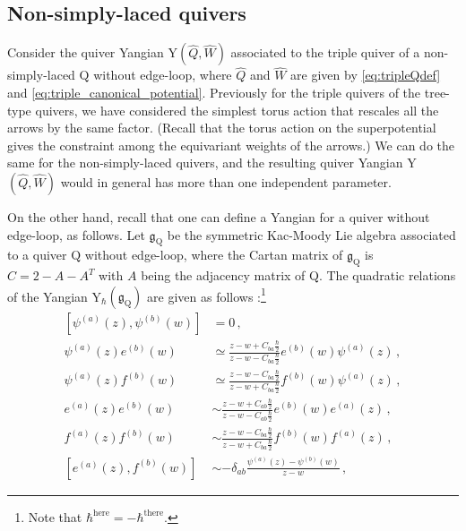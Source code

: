 \documentclass[12pt,a4paper]{article}
\renewcommand{\(}{\left(}
\renewcommand{\)}{\right)}
\renewcommand{\(}{\left(}
\renewcommand{\)}{\right)}
\begin{document}
\subsection{Non-simply-laced quivers
}\label{ssec:effective_quiver_yangian}

Consider the quiver Yangian Y$(\widehat{Q},\widehat{W})$ associated to the triple quiver of a non-simply-laced $\mathrm{Q}$ without edge-loop, where   $\widehat{Q}$ and $\widehat{W}$ are given by \eqref{eq:tripleQdef} and \eqref{eq:triple_canonical_potential}. 
Previously for the triple quivers of the tree-type quivers, we have considered the simplest torus action that rescales all the arrows by the same factor. 
(Recall that the torus action on the superpotential gives the constraint among the equivariant weights of the arrows.)
We can do the same for the non-simply-laced quivers, and the resulting quiver Yangian Y$(\widehat{Q},\widehat{W})$ would in general has more than one independent parameter.

On the other hand, recall that one can define a Yangian for a quiver without edge-loop, as follows.
Let $\mathfrak{g}_{\mathrm{Q}}$ be the symmetric Kac-Moody Lie algebra associated to a quiver $\mathrm{Q}$ without edge-loop, where the Cartan matrix of $\mathfrak{g}_{\mathrm{Q}}$ is 
$C=2-A-A^T$ with $A$ being the adjacency matrix of Q.
The quadratic relations of the Yangian Y$_\hbar(\mathfrak{g}_{\mathrm{Q}})$ are given as follows \cite{Yang_2014,yang2017}:\footnote{Note that $\hbar^{\textrm{here}}=-\hbar^{\textrm{there}}$.}
{\small
\begin{equation}\label{eq:Y(g_Q)}
\begin{aligned}
[\psi^{(a)}(z),\psi^{(b)}(w)]&=0\,,\\
\psi^{(a)}(z)e^{(b)}(w)&\simeq \frac{z-w+C_{ba}\frac{\hbar}{2}}{z-w-C_{ba}\frac{\hbar}{2}}e^{(b)}(w)\psi^{(a)}(z)\,,\\
\psi^{(a)}(z)f^{(b)}(w)&\simeq \frac{z-w-C_{ba}\frac{\hbar}{2}}{z-w+C_{ba}\frac{\hbar}{2}}f^{(b)}(w)\psi^{(a)}(z)\,,\\
e^{(a)}(z)e^{(b)}(w)&\sim \frac{z-w+C_{ab}\frac{\hbar}{2}}{z-w-C_{ab}\frac{\hbar}{2}}e^{(b)}(w)e^{(a)}(z)\,,\\
f^{(a)}(z)f^{(b)}(w)&\sim \frac{z-w-C_{ba}\frac{\hbar}{2}}{z-w+C_{ba}\frac{\hbar}{2}}f^{(b)}(w)f^{(a)}(z)\,,\\
[e^{(a)}(z),f^{(b)}(w)]&\sim-\delta_{ab}\frac{\psi^{(a)}(z)-\psi^{(b)}(w)}{z-w}\,,
\end{aligned}    
\end{equation}
}
\end{document}
